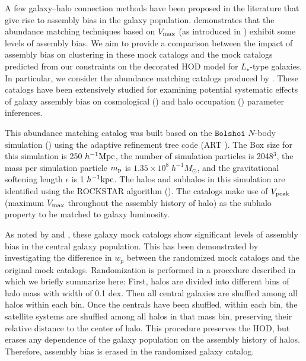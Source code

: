 \documentclass[12pt, preprint]{aastex}
\begin{document}
A few galaxy--halo connection methods have been proposed in the literature that give rise to assembly bias in the galaxy population. \citet{arz2014} demonstrates that the abundance matching techniques based on $V_{\rm max }$ (as introduced in \citealt{hw2013,reddick2013}) exhibit some levels of assembly bias. 
We aim to provide a comparison between the impact of assembly bias on clustering in these mock catalogs and the mock catalogs predicted from our constraints on the decorated HOD model for $L_{\star}$-type galaxies. In particular, we consider the abundance matching catalogs produced by \citet{hw2013}. These catalogs have been extensively studied for examining potential systematic effects of galaxy assembly bias on cosmological (\citealt{edHOD-weinberg}) and halo occupation (\citealt{arz2014}) parameter inferences. 

This abundance matching catalog was built based on the $\mathtt{Bolshoi}$ $N$-body simulation (\citealt{Klypin2011}) using the adaptive refinement tree code (ART \citealt{art}). The Box size for this simulation is 250 $h^{-1} \rm{Mpc}$, the number of simulation particles is 2048$^3$, the mass per simulation particle $m_{\rm p}$ is $1.35 \times 10^{8} \; h^{-1} M_{\odot}$, and the gravitational softening length $\epsilon$ is 1 $h^{-1} \rm{kpc}$. The halos and subhalos in this simulation are identified using the ROCKSTAR algorithm (\citealt{rockstar}). 
The \citealt{hw2013} catalogs make use of $V_{\rm peak}$ (maximum $V_{\rm max}$ throughout the assembly history of halo) as the subhalo property to be matched to galaxy luminosity. 

As noted by \citet{arz2014} and \citet{edHOD-weinberg}, these galaxy mock catalogs show significant levels of assembly bias in the central galaxy population. This has been demonstrated by investigating the difference in $w_{p}$ between the randomized mock catalogs and the original mock catalogs. Randomization is performed in a procedure described in \citet{arz2014} which we briefly summarize here: First, halos are divided into different bins of halo mass with width of 0.1 dex. Then all central galaxies are shuffled among all halos within each bin. Once the centrals have been shuffled, within each bin, the satellite systems are shuffled among all halos in that mass bin, preserving their relative distance to the center of halo. This procedure preserves the HOD, but erases any dependence of the galaxy population on the assembly history of halos. Therefore, assembly bias is erased in the randomized galaxy catalog. 
\end{document}
